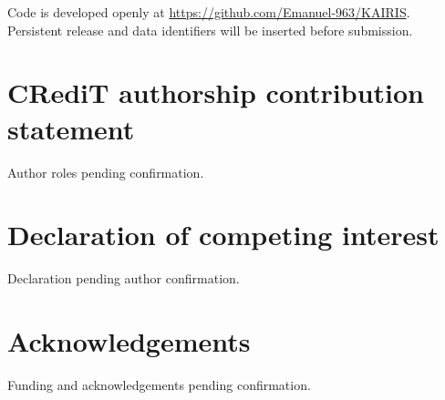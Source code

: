 \documentclass[a4paper,fleqn]{cas-sc}
\begin{document}
Code is developed openly at
\url{https://github.com/Emanuel-963/KAIRIS}. Persistent release and data
identifiers will be inserted before submission.

\section*{CRediT authorship contribution statement}

Author roles pending confirmation.

\section*{Declaration of competing interest}

Declaration pending author confirmation.

\section*{Acknowledgements}

Funding and acknowledgements pending confirmation.

\printcredits



\end{document}
